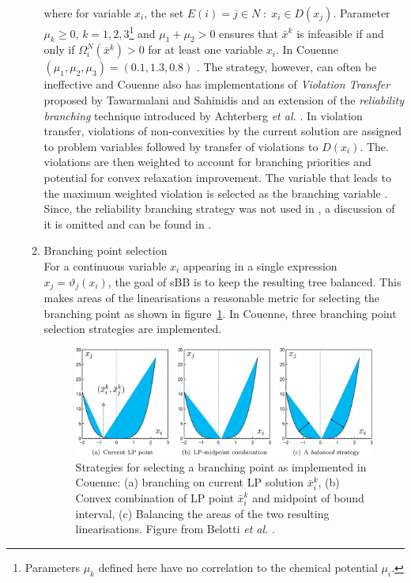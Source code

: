 \begin{enumerate}
\begin{enumerate}
				where for variable ${x}_i$, the set $E(i) = {j \in N \; : \; x_i \in D(x_j)}$. Parameter $\mu_k \geq 0, \, k = 1, 2, 3 $\footnote{Parameters $\mu_k$ defined here have no correlation to the chemical potential $\mu_i$.} and $\mu_1 + \mu_2 > 0$ ensures that $\bar{x}^k$ is infeasible if and only if $\Omega_i^N(\bar{x}^k) > 0$ for at least one variable $x_i$. In Couenne $(\mu_1, \mu_2, \mu_3) = (0.1, 1.3, 0.8)$ \cite{Belotti:2009aa}. The strategy, however, can often be ineffective and Couenne also has implementations of \emph{Violation Transfer} proposed by Tawarmalani and Sahinidis \cite{Tawarmalani:2004aa} and an extension of the \emph{reliability branching} technique introduced by Achterberg \textit{et al.} \cite{Achterberg:2005aa}. In violation transfer, violations of non-convexities by the current solution are assigned to problem variables followed by transfer of violations to $D(x_i)$.  The. violations are then weighted to account for branching priorities and potential for convex relaxation improvement. The variable that leads to the maximum weighted violation is selected as the branching variable \cite{Tawarmalani:2004aa}. Since, the reliability branching strategy was not used in {\GEM}, a discussion of it is omitted and can be found in \cite{Belotti:2022aa}.
			\item Branching point selection\\
				For a continuous variable $x_i$ appearing in a single expression $x_j = \vartheta_j(x_i)$, the goal of sBB is to keep the resulting tree balanced. This makes areas of the linearisations a reasonable metric for selecting the branching point as shown in figure~\ref{fig:branching_pt}. In Couenne, three branching point selection strategies are implemented.
				\begin{figure}[htbp]
					\centering
					\includegraphics[width=\textwidth]{figures/chapter-6/branching_point}
					\caption[Strategies for selecting a branching point]{Strategies for selecting a branching point as implemented in Couenne: (a) branching on current LP solution $\bar{x}_i^k$, (b) Convex combination of LP point $\bar{x}_i^k$ and midpoint of bound interval, (c) Balancing the areas of the two resulting linearisations. Figure from Belotti \textit{et al.} \cite{Belotti:2009aa}.}
			\label{fig:branching_pt}
			\end{figure}
		

\end{enumerate}
\end{enumerate}
